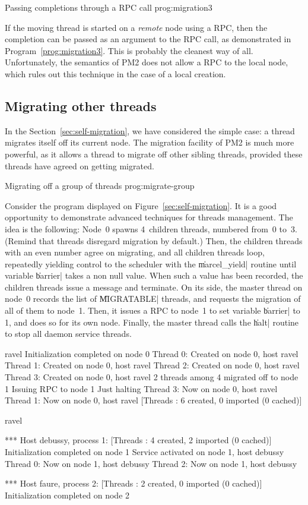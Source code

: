  {Passing completions through a RPC
  call} {prog:migration3}

If the moving thread is started on a \emph{remote} node using a RPC,
then the completion can be passed as an argument to the RPC call, as
demonstrated in Program~\ref{prog:migration3}. This is probably the
cleanest way of all. Unfortunately, the semantics of PM2 does not
allow a RPC to the local node, which rules out this technique in the
case of a local creation.

\subsection{Migrating other threads}

In the Section~\ref{sec:self-migration}, we have considered the simple
case: a thread migrates itself off its current node. The migration
facility of PM2 is much more powerful, as it allows a thread to
migrate off other sibling threads, provided these threads have agreed
on getting migrated.

 {Migrating off a group of
  threads} {prog:migrate-group}

Consider the program displayed on Figure~\ref{sec:self-migration}. It
is a good opportunity to demonstrate advanced techniques for threads
management. The idea is the following: Node~0 spawns 4~children
threads, numbered from~0 to~3. (Remind that threads disregard
migration by default.)  Then, the children threads with an even number
agree on migrating, and all children threads loop, repeatedly yielding
control to the scheduler with the \|marcel_yield| routine until variable
\|barrier| takes a non null value.  When such a value has been
recorded, the children threads issue a message and terminate. On its
side, the master thread on node~0 records the list of \|MIGRATABLE|
threads, and requests the migration of all of them to node~1. Then, it
issues a RPC to node~1 to set variable \|barrier| to 1, and does so
for its own node. Finally, the master thread calls the \|halt| routine
to stop all daemon service threads.
\begin{shell}
ravel%
Initialization completed on node 0
Thread 0: Created on node 0, host ravel
Thread 1: Created on node 0, host ravel
Thread 2: Created on node 0, host ravel
Thread 3: Created on node 0, host ravel
2 threads among 4 migrated off to node 1
Issuing RPC to node 1
Just halting
Thread 3: Now on node 0, host ravel
Thread 1: Now on node 0, host ravel
[Threads : 6 created, 0 imported (0 cached)]

ravel%

*** Host debussy, process 1:
[Threads : 4 created, 2 imported (0 cached)]
Initialization completed on node 1
Service activated on node 1, host debussy
Thread 0: Now on node 1, host debussy
Thread 2: Now on node 1, host debussy

*** Host faure, process 2:
[Threads : 2 created, 0 imported (0 cached)]
Initialization completed on node 2
\end{shell}


